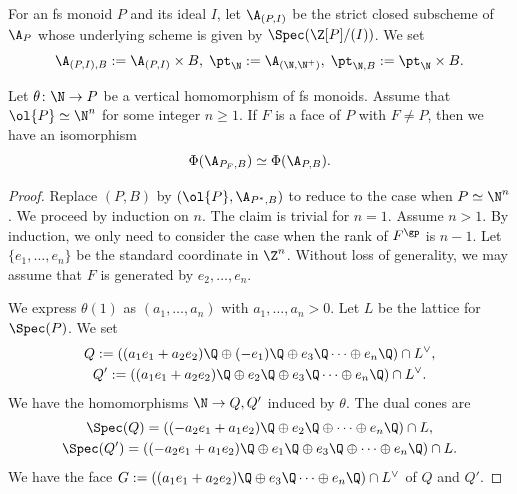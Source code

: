 \documentclass[10pt]{amsart}
\begin{document}
For an fs monoid $P$ and its ideal $I$, let $\A_{(P,I)}$ be the strict closed subscheme of $\A_P$ whose underlying scheme is given by $\Spec(\Z[P]/(I))$.
We set
\[
\A_{(P,I),B}:=\A_{(P,I)}\times B,
\;
\pt_{\N}:=\A_{(\N,\N^+)},
\;
\pt_{\N,B}:=\pt_{\N}\times B.
\]



\begin{lem}
\label{lemma.17}
Let $\theta\colon \N\to P$ be a vertical homomorphism of fs monoids.
Assume that $\ol{P}\simeq \N^n$ for some  integer $n\geq 1$.
If $F$ is a face of $P$ with $F\neq P$, then we have an isomorphism
\[
\Phi(\A_{P_F,B})
\simeq
\Phi(\A_{P,B}).
\]
\end{lem}
\begin{proof}
Replace $(P,B)$ by $(\ol{P},\A_{P^*,B})$ to reduce to the case when $P\simeq \N^n$.
We proceed by induction on $n$.
The claim is trivial for $n=1$.
Assume $n>1$.
By induction, we only need to consider the case when the rank of $F^\gp$ is $n-1$.
Let $\{e_1,\ldots,e_n\}$ be the standard coordinate in $\Z^n$.
Without loss of generality, we may assume that $F$ is generated by $e_2,\ldots,e_n$.


We express $\theta(1)$ as $(a_1,\ldots,a_n)$ with $a_1,\ldots,a_n >0$.
Let $L$ be the lattice for $\Spec(P)$.
We set
\begin{gather*}
Q:=((a_1e_1+a_2e_2)\Q\oplus (-e_1)\Q \oplus e_3\Q\cdots \oplus e_n \Q)\cap L^\vee,
\\
Q':=((a_1e_1+a_2e_2)\Q\oplus e_2\Q\oplus e_3\Q\cdots \oplus e_n \Q)\cap L^\vee.
\end{gather*}
We have the homomorphisms $\N\to Q,Q'$ induced by $\theta$.
The dual cones are
\begin{gather*}
\Spec(Q)=((-a_2e_1+a_1e_2)\Q \oplus e_2 \Q \oplus \cdots \oplus e_n \Q)\cap L,
\\
\Spec(Q')=((-a_2e_1+a_1e_2)\Q \oplus e_1 \Q\oplus e_3\Q\oplus \cdots \oplus e_n \Q)\cap L.
\end{gather*}
We have the face $G:=((a_1e_1+a_2e_2)\Q\oplus e_3\Q\cdots \oplus e_n \Q)\cap L^\vee$ of $Q$ and $Q'$.





\end{proof}
\end{document}
